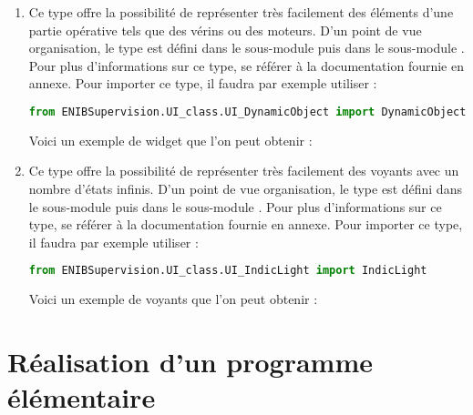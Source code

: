 {\begin{enumerate}
\item {}\newline
Ce type offre la possibilité de représenter très facilement des éléments d'une partie opérative tels que des vérins ou des moteurs.\newline
D'un point de vue organisation, le type  est défini dans le sous-module  puis dans le sous-module \newline {}.\newline
Pour plus d'informations sur ce type, se référer à la documentation fournie en annexe.\newline
Pour importer ce type, il faudra par exemple utiliser :
\begin{lstlisting}[language=Python]
from ENIBSupervision.UI_class.UI_DynamicObject import DynamicObject
\end{lstlisting}
Voici un exemple de widget que l'on peut obtenir :

\newpage

\item {}\newline
Ce type offre la possibilité de représenter très facilement des voyants avec un nombre d'états infinis.\newline
D'un point de vue organisation, le type  est défini dans le sous-module  puis dans le sous-module \newline {}.\newline
Pour plus d'informations sur ce type, se référer à la documentation fournie en annexe.\newline
Pour importer ce type, il faudra par exemple utiliser :
\begin{lstlisting}[language=Python]
from ENIBSupervision.UI_class.UI_IndicLight import IndicLight
\end{lstlisting}
Voici un exemple de voyants que l'on peut obtenir :

\end{enumerate}




\chapter{Réalisation d'un programme élémentaire}

}
